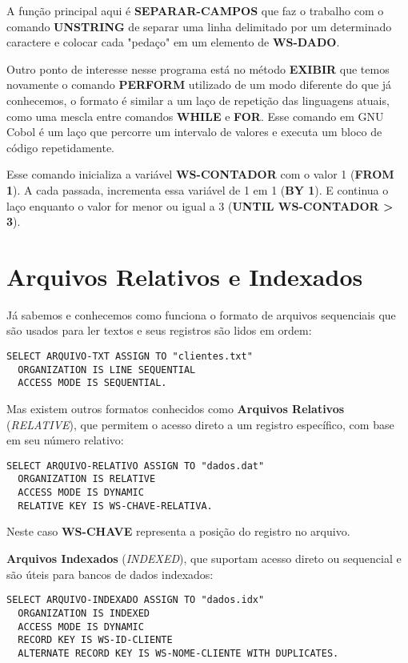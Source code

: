 A função principal aqui é \textbf{SEPARAR-CAMPOS} que faz o trabalho com o comando \textbf{UNSTRING} de separar uma linha delimitado por um determinado caractere e colocar cada "pedaço" em um elemento de \textbf{WS-DADO}.

Outro ponto de interesse nesse programa está no método \textbf{EXIBIR} que temos novamente o comando \textbf{PERFORM} utilizado de um modo diferente do que já conhecemos, o formato é similar a um laço de repetição das linguagens atuais, como uma mescla entre comandos \textbf{WHILE} e \textbf{FOR}. Esse comando em GNU Cobol é um laço que percorre um intervalo de valores e executa um bloco de código repetidamente.


Esse comando inicializa a variável \textbf{WS-CONTADOR} com o valor 1 (\textbf{FROM 1}). A cada passada, incrementa essa variável de 1 em 1 (\textbf{BY 1}). E continua o laço enquanto o valor for menor ou igual a 3 (\textbf{UNTIL WS-CONTADOR > 3}).

\section{Arquivos Relativos e Indexados}
Já sabemos e conhecemos como funciona o formato de arquivos sequenciais que são usados para ler textos e seus registros são lidos em ordem:
\begin{lstlisting}[]
SELECT ARQUIVO-TXT ASSIGN TO "clientes.txt"
  ORGANIZATION IS LINE SEQUENTIAL
  ACCESS MODE IS SEQUENTIAL.	
\end{lstlisting}

Mas existem outros formatos conhecidos como \textbf{Arquivos Relativos} (\textit{RELATIVE}), que permitem o acesso direto a um registro específico, com base em seu número relativo:
\begin{lstlisting}[]
SELECT ARQUIVO-RELATIVO ASSIGN TO "dados.dat"
  ORGANIZATION IS RELATIVE
  ACCESS MODE IS DYNAMIC
  RELATIVE KEY IS WS-CHAVE-RELATIVA.	
\end{lstlisting}

Neste caso \textbf{WS-CHAVE} representa a posição do registro no arquivo.

\textbf{Arquivos Indexados} (\textit{INDEXED}), que suportam acesso direto ou sequencial e são úteis para bancos de dados indexados:
\begin{lstlisting}[]
SELECT ARQUIVO-INDEXADO ASSIGN TO "dados.idx"
  ORGANIZATION IS INDEXED
  ACCESS MODE IS DYNAMIC
  RECORD KEY IS WS-ID-CLIENTE
  ALTERNATE RECORD KEY IS WS-NOME-CLIENTE WITH DUPLICATES.	
\end{lstlisting}

